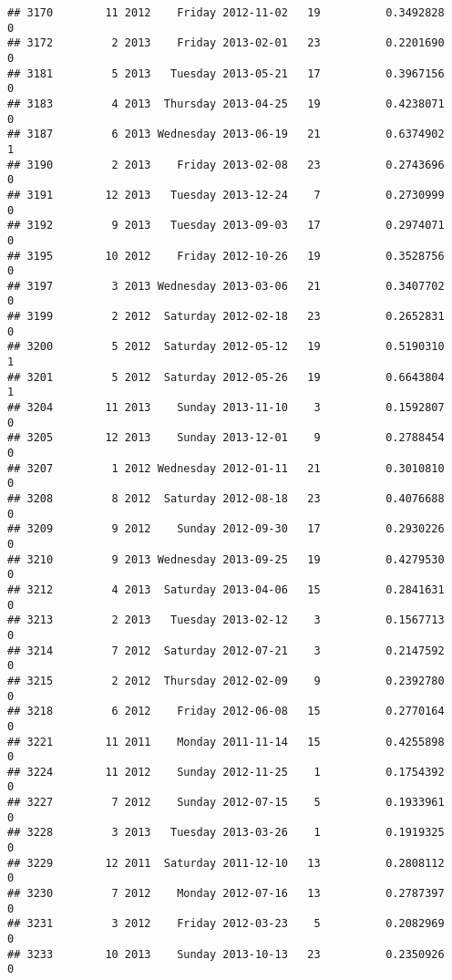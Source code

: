 \documentclass[
]{article}
\begin{document}
\begin{verbatim}
## 3170        11 2012    Friday 2012-11-02   19          0.3492828             0
## 3172         2 2013    Friday 2013-02-01   23          0.2201690             0
## 3181         5 2013   Tuesday 2013-05-21   17          0.3967156             0
## 3183         4 2013  Thursday 2013-04-25   19          0.4238071             0
## 3187         6 2013 Wednesday 2013-06-19   21          0.6374902             1
## 3190         2 2013    Friday 2013-02-08   23          0.2743696             0
## 3191        12 2013   Tuesday 2013-12-24    7          0.2730999             0
## 3192         9 2013   Tuesday 2013-09-03   17          0.2974071             0
## 3195        10 2012    Friday 2012-10-26   19          0.3528756             0
## 3197         3 2013 Wednesday 2013-03-06   21          0.3407702             0
## 3199         2 2012  Saturday 2012-02-18   23          0.2652831             0
## 3200         5 2012  Saturday 2012-05-12   19          0.5190310             1
## 3201         5 2012  Saturday 2012-05-26   19          0.6643804             1
## 3204        11 2013    Sunday 2013-11-10    3          0.1592807             0
## 3205        12 2013    Sunday 2013-12-01    9          0.2788454             0
## 3207         1 2012 Wednesday 2012-01-11   21          0.3010810             0
## 3208         8 2012  Saturday 2012-08-18   23          0.4076688             0
## 3209         9 2012    Sunday 2012-09-30   17          0.2930226             0
## 3210         9 2013 Wednesday 2013-09-25   19          0.4279530             0
## 3212         4 2013  Saturday 2013-04-06   15          0.2841631             0
## 3213         2 2013   Tuesday 2013-02-12    3          0.1567713             0
## 3214         7 2012  Saturday 2012-07-21    3          0.2147592             0
## 3215         2 2012  Thursday 2012-02-09    9          0.2392780             0
## 3218         6 2012    Friday 2012-06-08   15          0.2770164             0
## 3221        11 2011    Monday 2011-11-14   15          0.4255898             0
## 3224        11 2012    Sunday 2012-11-25    1          0.1754392             0
## 3227         7 2012    Sunday 2012-07-15    5          0.1933961             0
## 3228         3 2013   Tuesday 2013-03-26    1          0.1919325             0
## 3229        12 2011  Saturday 2011-12-10   13          0.2808112             0
## 3230         7 2012    Monday 2012-07-16   13          0.2787397             0
## 3231         3 2012    Friday 2012-03-23    5          0.2082969             0
## 3233        10 2013    Sunday 2013-10-13   23          0.2350926             0

\end{verbatim}
\end{document}
